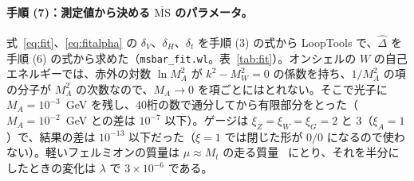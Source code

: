 \documentclass[a4paper,10pt]{ltjsarticle}
\newcommand{\MSbar}{\overline{\mathrm{MS}}}
\begin{document}
\paragraph{手順 (7)：測定値から決める $\MSbar$ のパラメータ。}式~\eqref{eq:fit}、\eqref{eq:fitalpha} の $\delta_V$、$\delta_H$、$\delta_t$ を手順 (3) の式から LoopTools で、$\hat\Delta$ を手順 (6) の式から求めた（\texttt{msbar\_fit.wl}。表~\ref{tab:fit}）。オンシェルの $W$ の自己エネルギーでは、赤外の対数 $\ln M_A^2$ が $k^2-M_W^2=0$ の係数を持ち、$1/M_A^2$ の項の分子が $M_A^2$ の次数なので、$M_A\to0$ を項ごとにはとれない。そこで光子に $M_A=10^{-3}$~GeV を残し、40桁の数で通分してから有限部分をとった（$M_A=10^{-2}$~GeV との差は $10^{-7}$ 以下）。ゲージは $\xi_Z=\xi_W=\xi_G=2$ と $3$（$\xi_A=1$）で、結果の差は $10^{-13}$ 以下だった（$\xi=1$ では閉じた形が $0/0$ になるので使わない）。軽いフェルミオンの質量は $\mu\approx M_t$ の走る質量~\cite{mr19} にとり、それを半分にしたときの変化は $\lambda$ で $3\times10^{-6}$ である。
\end{document}
